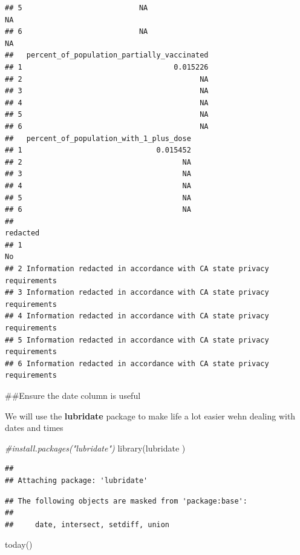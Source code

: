 \documentclass[
]{article}
\newenvironment{Shaded}{\begin{snugshade}}{\end{snugshade}}
\newcommand{\CommentTok}[1]{\textcolor[rgb]{0.56,0.35,0.01}{\textit{#1}}}
\newcommand{\FunctionTok}[1]{\textcolor[rgb]{0.00,0.00,0.00}{#1}}
\newcommand{\NormalTok}[1]{#1}
\begin{document}
\begin{verbatim}
## 5                           NA                                     NA
## 6                           NA                                     NA
##   percent_of_population_partially_vaccinated
## 1                                   0.015226
## 2                                         NA
## 3                                         NA
## 4                                         NA
## 5                                         NA
## 6                                         NA
##   percent_of_population_with_1_plus_dose
## 1                               0.015452
## 2                                     NA
## 3                                     NA
## 4                                     NA
## 5                                     NA
## 6                                     NA
##                                                                redacted
## 1                                                                    No
## 2 Information redacted in accordance with CA state privacy requirements
## 3 Information redacted in accordance with CA state privacy requirements
## 4 Information redacted in accordance with CA state privacy requirements
## 5 Information redacted in accordance with CA state privacy requirements
## 6 Information redacted in accordance with CA state privacy requirements
\end{verbatim}

\#\#Ensure the date column is useful

We will use the \textbf{lubridate} package to make life a lot easier
wehn dealing with dates and times

\begin{Shaded}
\begin{Highlighting}[]
\CommentTok{\#install.packages("lubridate")}
\FunctionTok{library}\NormalTok{(lubridate )}
\end{Highlighting}
\end{Shaded}

\begin{verbatim}
## 
## Attaching package: 'lubridate'
\end{verbatim}

\begin{verbatim}
## The following objects are masked from 'package:base':
## 
##     date, intersect, setdiff, union
\end{verbatim}

\begin{Shaded}
\begin{Highlighting}[]
\FunctionTok{today}\NormalTok{()}
\end{Highlighting}
\end{Shaded}
\end{document}
